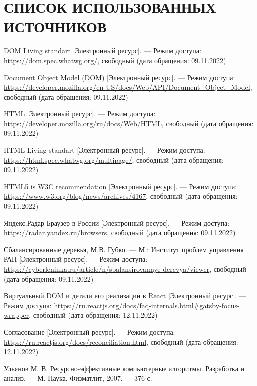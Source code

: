 \section*{СПИСОК ИСПОЛЬЗОВАННЫХ ИСТОЧНИКОВ}

\begingroup
\renewcommand{\section}[2]{}
\begin{thebibliography}{}
	
	DOM Living standart [Электронный ресурс]. --- Режим доступа: \url{https://dom.spec.whatwg.org/}, свободный (дата обращения: 09.11.2022)
	
	Document Object Model (DOM) [Электронный ресурс]. --- Режим доступа: \url{https://developer.mozilla.org/en-US/docs/Web/API/Document_Object_Model}, свободный (дата обращения: 09.11.2022)
	
	HTML [Электронный ресурс]. --- Режим доступа: \url{https://developer.mozilla.org/ru/docs/Web/HTML}, свободный (дата обращения: 09.11.2022)
	
	HTML Living standart [Электронный ресурс]. --- Режим доступа: \url{https://html.spec.whatwg.org/multipage/}, свободный (дата обращения: 09.11.2022)
	
	HTML5 is W3C recommendation [Электронный ресурс]. --- Режим доступа: \url{https://www.w3.org/blog/news/archives/4167}, свободный (дата обращения: 09.11.2022)
	
	Яндекс.Радар Браузер в России [Электронный ресурс]. --- Режим доступа:
	\url{https://radar.yandex.ru/browsers}, свободный (дата обращения: 09.11.2022)
	
	Сбалансированные деревья, М.В. Губко. --- М.: Институт проблем управления РАН [Электронный ресурс]. --- Режим доступа: \url{https://cyberleninka.ru/article/n/sbalansirovannye-derevya/viewer}, свободный (дата обращения: 09.11.2022)
	
	Виртуальный DOM и детали его реализации в React [Электронный ресурс]. --- Режим доступа: \url{https://ru.reactjs.org/docs/faq-internals.html#gatsby-focus-wrapper}, свободный (дата обращения: 12.11.2022)
	
	Согласование [Электронный ресурс]. --- Режим доступа: \url{https://ru.reactjs.org/docs/reconciliation.html}, свободный (дата обращения: 12.11.2022)
	
	Ульянов М. В. Ресурсно-эффективные компьютерные алгоритмы. Разработка и анализ. --- М. Наука, Физматлит, 2007. --- 376 с.
\end{thebibliography}
\endgroup

\pagebreak